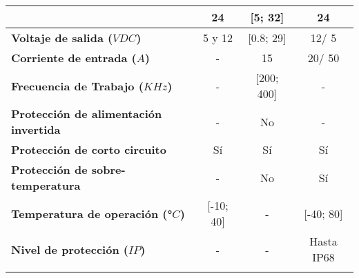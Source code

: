 \begin{savenotes}
\begin{mytable}[H]
\begin{tabular}{l|c|c|c|}
{\begin{minipage}{\myforthmaxsizeofcontenttable}
				\end{minipage}
			} & 24 & [5; 32] & 24 \\ \hline
			\multicolumn{1}{|l|}{
				\begin{minipage}{\myforthmaxsizeofcontenttable}	
					\textbf{Voltaje de salida ($VDC$)}
				\end{minipage}
			} & 5 y 12 & [0.8; 29] & 12/ 5\\ \hline			
			\multicolumn{1}{|l|}{
				\begin{minipage}{\myforthmaxsizeofcontenttable}	
					\textbf{Corriente de entrada ($A$)}
				\end{minipage}
			} & - & 15 & 20/ 50 \\ \hline
			\multicolumn{1}{|l|}{
				\begin{minipage}{\myforthmaxsizeofcontenttable}	
					\textbf{Frecuencia de Trabajo ($KHz$)}
				\end{minipage}
			} & - & [200; 400] & -  \\ \hline			
			\multicolumn{1}{|l|}{
				\begin{minipage}{\myforthmaxsizeofcontenttable}	
					\textbf{Protección de alimentación invertida}
				\end{minipage}
			} & - & No & -  \\ \hline	
			\multicolumn{1}{|l|}{
				\begin{minipage}{\myforthmaxsizeofcontenttable}	
					\textbf{Protección de corto circuito}
				\end{minipage}
			} & Sí & Sí & Sí  \\ \hline		
			\multicolumn{1}{|l|}{
				\begin{minipage}{\myforthmaxsizeofcontenttable}	
					\textbf{Protección de sobre-temperatura}
				\end{minipage}
			} & - & No & Sí  \\ \hline
			\multicolumn{1}{|l|}{
				\begin{minipage}{\myforthmaxsizeofcontenttable}	
					\textbf{Temperatura de operación (°$C$)}
				\end{minipage}
			} & [-10; 40] & - & [-40; 80]  \\ \hline		
			\multicolumn{1}{|l|}{
				\begin{minipage}{\myforthmaxsizeofcontenttable}	
					\textbf{Nivel de protección ($IP$)}
				\end{minipage}
			} & - & - & Hasta IP68  \\ \hline		
			\multicolumn{1}{|l|}{
				\begin{minipage}{\myforthmaxsizeofcontenttable}	

\end{minipage}}
\end{tabular}
\end{mytable}
\end{savenotes}
